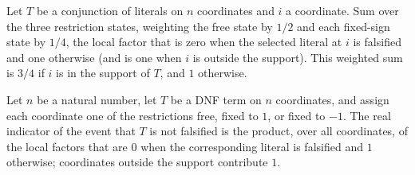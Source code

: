 \begin{theorem}
\label{FABL.DNFTerm.localNotFalsifiedFactor_sum}
\leanok
{}
Let $T$ be a conjunction of literals on $n$ coordinates and $i$ a coordinate. Sum over
the three restriction states, weighting the free state by $1/2$ and each fixed-sign
state by $1/4$, the local factor that is zero when the selected literal at $i$ is
falsified and one otherwise (and is one when $i$ is outside the support). This weighted
sum is $3/4$ if $i$ is in the support of $T$, and $1$ otherwise.
\end{theorem}

\begin{theorem}
\label{FABL.DNFTerm.notFalsified_indicator_eq_prod}
\leanok
{}
Let $n$ be a natural number, let $T$ be a DNF term on $n$ coordinates, and assign each
coordinate one of the restrictions free, fixed to $1$, or fixed to $-1$. The real
indicator of the event that $T$ is not falsified is the product, over all coordinates,
of the local factors that are $0$ when the corresponding literal is falsified and $1$
otherwise; coordinates outside the support contribute $1$.
\end{theorem}

